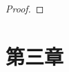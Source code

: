 \documentclass[UTF8]{article}
\begin{document}
\begin{proof}




\end{proof}

\newpage
\section{第三章}
\end{document}
